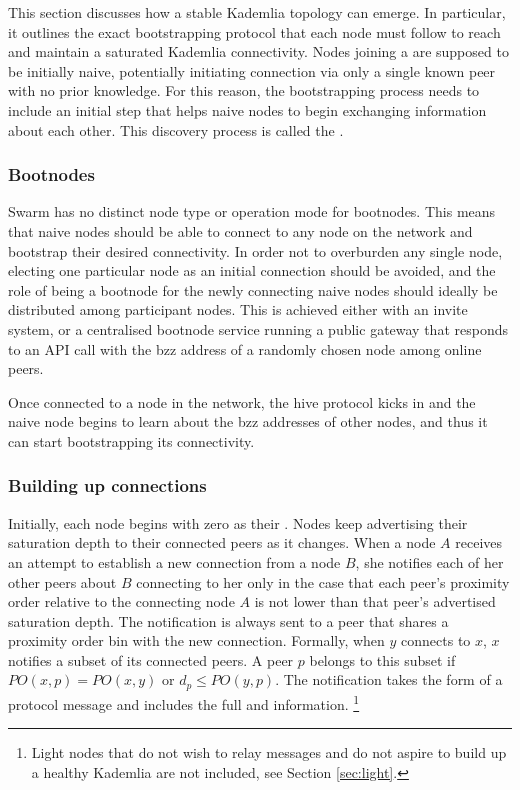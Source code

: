  
This section discusses how a stable Kademlia topology can emerge. In particular, it outlines the exact bootstrapping protocol that each node must follow to reach and maintain a saturated Kademlia connectivity. Nodes joining a  are supposed to be initially naive, potentially initiating connection via only a single known peer with no prior knowledge. For this reason, the bootstrapping process needs to include an initial step that helps naive nodes to begin exchanging information about each other. This discovery process is called the .

\subsubsection{Bootnodes}

Swarm has no distinct node type or operation mode for bootnodes. This means that naive nodes should be able to connect to any node on the  network and bootstrap their desired connectivity. In order not to overburden any single node, electing one particular node as an initial connection should be avoided, and the role of being a bootnode for the newly connecting naive nodes should ideally be distributed among participant nodes. This is achieved either with an invite system, or a centralised bootnode service running a public gateway that responds to an API call with the bzz address of a randomly chosen node among online peers. 

Once connected to a node in the network, the hive protocol kicks in and the naive node begins to learn about the bzz addresses of other nodes, and thus it can start bootstrapping its connectivity.

\subsubsection{Building up connections}

Initially, each node begins with zero as their . Nodes keep advertising their saturation depth to their connected peers as it changes. When a node $A$ receives an attempt to establish a new connection from a node $B$, she notifies each of her other peers about $B$ connecting to her only in the case that each peer's proximity order relative to the connecting node $A$ is not lower than that peer's advertised saturation depth. The notification is always sent to a peer that shares a proximity order bin with the new connection. Formally, when $y$ connects to $x$, $x$ notifies a subset of its connected peers. A peer $p$ belongs to this subset if $\mathit{PO}(x, p) = \mathit{PO}(x, y)$ or $d_p\leq \mathit{PO}(y, p)$. The notification takes the form of a protocol message and includes the full  and  information.%
%
\footnote{Light nodes that do not wish to relay messages and do not aspire to build up a healthy Kademlia are not included, see Section \ref{sec:light}. }


